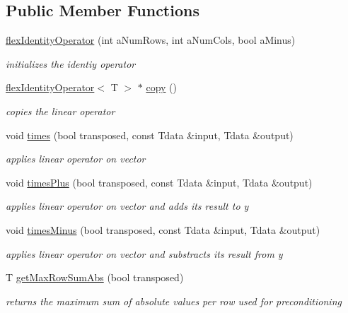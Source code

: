 \subsection*{Public Member Functions}
\begin{DoxyCompactItemize}
\item 
\hyperlink{classflex_identity_operator_acd55573556fc2313b0280f54c7a6730a}{flex\+Identity\+Operator} (int a\+Num\+Rows, int a\+Num\+Cols, bool a\+Minus)
\begin{DoxyCompactList}\small\item\em initializes the identiy operator \end{DoxyCompactList}\item 
\hyperlink{classflex_identity_operator}{flex\+Identity\+Operator}$<$ T $>$ $\ast$ \hyperlink{classflex_identity_operator_abbd34b97e3e014f02629a68a02f5c41b}{copy} ()
\begin{DoxyCompactList}\small\item\em copies the linear operator \end{DoxyCompactList}\item 
void \hyperlink{classflex_identity_operator_a97ec4aaba5d98227a9865110ad2e7641}{times} (bool transposed, const Tdata \&input, Tdata \&output)
\begin{DoxyCompactList}\small\item\em applies linear operator on vector \end{DoxyCompactList}\item 
void \hyperlink{classflex_identity_operator_a373447505ab85d4d2cf5267fbd03a9d9}{times\+Plus} (bool transposed, const Tdata \&input, Tdata \&output)
\begin{DoxyCompactList}\small\item\em applies linear operator on vector and adds its result to y \end{DoxyCompactList}\item 
void \hyperlink{classflex_identity_operator_a931f2e5ac3651a7f89e78213f08484e9}{times\+Minus} (bool transposed, const Tdata \&input, Tdata \&output)
\begin{DoxyCompactList}\small\item\em applies linear operator on vector and substracts its result from y \end{DoxyCompactList}\item 
T \hyperlink{classflex_identity_operator_ac9127077af24910e90eb0239a2508306}{get\+Max\+Row\+Sum\+Abs} (bool transposed)
\begin{DoxyCompactList}\small\item\em returns the maximum sum of absolute values per row used for preconditioning \end{DoxyCompactList}\item 

\end{DoxyCompactItemize}
